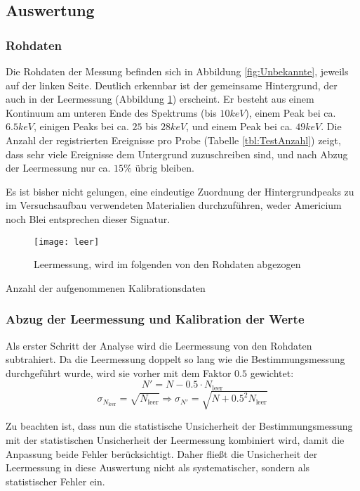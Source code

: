 \documentclass{../Misc/MontavonLaTeX/Montavon}
\newcommand{\fullwidth}{1.0\textwidth}
\begin{document}
\subsection{Auswertung}
\subsubsection{Rohdaten}
Die Rohdaten der Messung befinden sich in Abbildung \ref{fig:Unbekannte}, jeweils auf der linken Seite. Deutlich erkennbar ist der gemeinsame Hintergrund, der auch in der Leermessung (Abbildung \ref{fig:Leermessung}) erscheint. Er besteht aus einem Kontinuum am unteren Ende des Spektrums (bis $10 \unit{keV}$), einem Peak bei ca. $6.5 \unit{keV}$, einigen Peaks bei ca. $25$ bis $28 \unit{keV}$, und einem Peak bei ca. $49 \unit{keV}$. 
Die Anzahl der registrierten Ereignisse pro Probe (Tabelle \ref{tbl:TestAnzahl}) zeigt, dass sehr viele Ereignisse dem Untergrund zuzuschreiben sind, und nach Abzug der Leermessung nur ca. $15 \unit{\%}$ übrig bleiben.

Es ist bisher nicht gelungen, eine eindeutige Zuordnung der Hintergrundpeaks zu im Versuchsaufbau verwendeten Materialien durchzuführen, weder Americium noch Blei entsprechen dieser Signatur\cite{nist}.


\begin{figure}[htbp]
\centering
\texttt{[image: leer]}
\caption{Leermessung, wird im folgenden von den Rohdaten abgezogen}
\label{fig:Leermessung}
\end{figure}

\begin{table}[htbp]
\centering

\caption{Anzahl der aufgenommenen Kalibrationsdaten}
\label{tbl:TestAnzahl}
\end{table}

\subsubsection{Abzug der Leermessung und Kalibration der Werte}
Als erster Schritt der Analyse wird die Leermessung von den Rohdaten subtrahiert. Da die Leermessung doppelt so lang wie die Bestimmungsmessung durchgeführt wurde, wird sie vorher mit dem Faktor $0.5$ gewichtet:
\[ N' = N - 0.5 \cdot N_\textrm{leer} \]
\[ \sigma_{N_\textrm{leer}} = \sqrt{N_\textrm{leer}} \Rightarrow \sigma_{N'} = \sqrt{N + 0.5^2 N_\textrm{leer}}  \]

Zu beachten ist, dass nun die statistische Unsicherheit der Bestimmungsmessung mit der statistischen Unsicherheit der Leermessung kombiniert wird, damit die Anpassung beide Fehler berücksichtigt. Daher fließt die Unsicherheit der Leermessung in diese Auswertung nicht als systematischer, sondern als statistischer Fehler ein.
\end{document}
